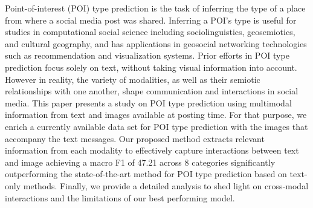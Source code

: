 Point-of-interest (POI) type prediction is the task of inferring the type of a place from where a social media post was shared. Inferring a POI's type is useful for studies in computational social science including sociolinguistics, geosemiotics, and cultural geography, and has applications in geosocial networking technologies such as recommendation and visualization systems. Prior efforts in POI type prediction focus solely on text, without taking visual information into account. However in reality, the variety of modalities, as well as their semiotic relationships with one another, shape communication and interactions in social media. This paper presents a study on POI type prediction using multimodal information from text and images available at posting time. For that purpose, we enrich a currently available data set for POI type prediction with the images that accompany the text messages. Our proposed method extracts relevant information from each modality to effectively capture interactions between text and image achieving a macro F1 of 47.21 across 8 categories significantly outperforming the state-of-the-art method for POI type prediction based on text-only methods. Finally, we provide a detailed analysis to shed light on cross-modal interactions and the limitations of our best performing model.
